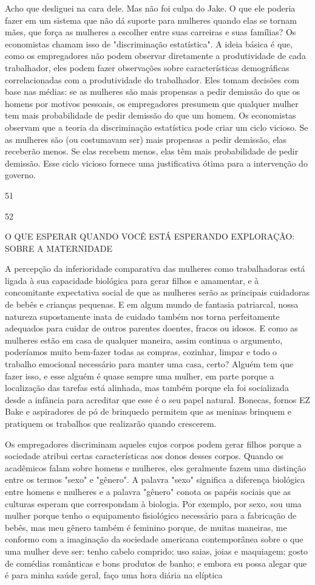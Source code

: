  \par 
Acho que desliguei na cara dele. Mas não foi culpa do Jake. O que ele poderia fazer em um sistema que não dá suporte para mulheres quando elas se tornam mães, que força as mulheres a escolher entre suas carreiras e suas famílias? Os economistas chamam isso de "discriminação estatística". A ideia básica é que, como os empregadores não podem observar diretamente a produtividade de cada trabalhador, eles podem fazer observações sobre características demográficas correlacionadas com a produtividade do trabalhador. Eles tomam decisões com base nas médias: se as mulheres são mais propensas a pedir demissão do que os homens por motivos pessoais, os empregadores presumem que qualquer mulher tem mais probabilidade de pedir demissão do que um homem. Os economistas observam que a teoria da discriminação estatística pode criar um ciclo vicioso. Se as mulheres são (ou costumavam ser) mais propensas a pedir demissão, elas receberão menos. Se elas recebem menos, elas têm mais probabilidade de pedir demissão. Esse ciclo vicioso fornece uma justificativa ótima para a intervenção do governo.
 \par 
51
 \par 
52
 \par 
O QUE ESPERAR QUANDO VOCÊ ESTÁ ESPERANDO EXPLORAÇÃO: SOBRE A MATERNIDADE
 \par 
A percepção da inferioridade comparativa das mulheres como trabalhadoras está ligada à sua capacidade biológica para gerar filhos e amamentar, e à concomitante expectativa social de que as mulheres serão as principais cuidadoras de bebês e crianças pequenas. E em algum mundo de fantasia patriarcal, nossa natureza supostamente inata de cuidado também nos torna perfeitamente adequados para cuidar de outros parentes doentes, fracos ou idosos. E como as mulheres estão em casa de qualquer maneira, assim continua o argumento, poderíamos muito bem-fazer todas as compras, cozinhar, limpar e todo o trabalho emocional necessário para manter uma casa, certo? Alguém tem que fazer isso, e esse alguém é quase sempre uma mulher, em parte porque a localização das tarefas está alinhada, mas também porque ela foi socializada desde a infância para acreditar que esse é o seu papel natural. Bonecas, fornos EZ Bake e aspiradores de pó de brinquedo permitem que as meninas brinquem e pratiquem os trabalhos que realizarão quando crescerem.
 \par 
Os empregadores discriminam aqueles cujos corpos podem gerar filhos porque a sociedade atribui certas características aos donos desses corpos. Quando os acadêmicos falam sobre homens e mulheres, eles geralmente fazem uma distinção entre os termos "sexo" e "gênero". A palavra "sexo" significa a diferença biológica entre homens e mulheres e a palavra "gênero" conota os papéis sociais que as culturas esperam que correspondam à biologia. Por exemplo, por sexo, sou uma mulher porque tenho o equipamento fisiológico necessário para a fabricação de bebês, mas meu gênero também é feminino porque, de muitas maneiras, me conformo com a imaginação da sociedade americana contemporânea sobre o que uma mulher deve ser: tenho cabelo comprido; uso saias, joias e maquiagem; gosto de comédias românticas e bons produtos de banho; e embora eu possa alegar que é para minha saúde geral, faço uma hora diária na elíptica
